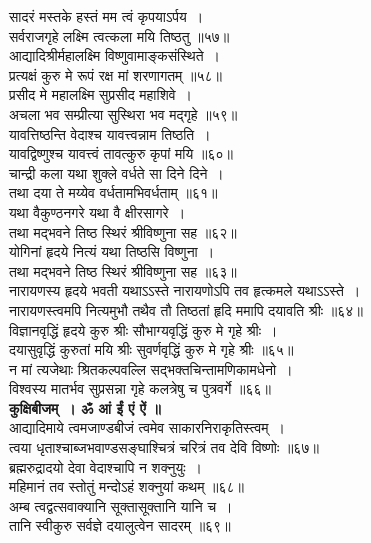 \documentclass[twoside,top=1.7cm, bottom=1.7cm, outer=1cm,landscape, inner=1.5cm,a5paper,]{book}
\begin{document}
\begin{center}
\newpage
सादरं मस्तके हस्तं मम त्वं कृपयाऽर्पय~।\\
सर्वराजगृहे लक्ष्मि त्वत्कला मयि तिष्ठतु ॥५७॥\\[10pt]
आद्यादिश्रीर्महालक्ष्मि विष्णुवामाङ्कसंस्थिते~।\\
प्रत्यक्षं कुरु मे रूपं रक्ष मां शरणागतम् ॥५८॥\\[10pt]
प्रसीद मे महालक्ष्मि सुप्रसीद महाशिवे~।\\
अचला भव सम्प्रीत्या सुस्थिरा भव मद्गृहे ॥५९॥\\[10pt]
यावत्तिष्ठन्ति वेदाश्च यावत्त्वन्नाम तिष्ठति~।\\
यावद्विष्णुश्च यावत्त्वं तावत्कुरु कृपां मयि ॥६०॥\\[10pt]
\newpage
चान्द्री कला यथा शुक्ले वर्धते सा दिने दिने~।\\
तथा दया ते मय्येव वर्धतामभिवर्धताम् ॥६१॥\\[10pt]
यथा वैकुण्ठनगरे यथा वै क्षीरसागरे~।\\
तथा मद्भवने तिष्ठ स्थिरं श्रीविष्णुना सह ॥६२॥\\[10pt]
योगिनां हृदये नित्यं यथा तिष्ठसि विष्णुना~।\\
तथा मद्भवने तिष्ठ स्थिरं श्रीविष्णुना सह ॥६३॥\\[10pt]
नारायणस्य हृदये भवती यथाऽऽस्ते नारायणोऽपि तव हृत्कमले यथाऽऽस्ते~।\\
नारायणस्त्वमपि नित्यमुभौ तथैव तौ तिष्ठतां हृदि ममापि दयावति श्रीः ॥६४॥\\[10pt]
\newpage
विज्ञानवृद्धिं हृदये कुरु श्रीः सौभाग्यवृद्धिं कुरु मे गृहे श्रीः~।\\
दयासुवृद्धिं कुरुतां मयि श्रीः सुवर्णवृद्धिं कुरु मे गृहे श्रीः ॥६५॥\\[10pt]
न मां त्यजेथाः श्रितकल्पवल्लि सद्भक्तचिन्तामणिकामधेनो~।\\
विश्वस्य मातर्भव सुप्रसन्ना गृहे कलत्रेषु च पुत्रवर्गे ॥६६॥\\[10pt]
{\bfseries कुक्षिबीजम्~। ॐ आं ईं एं ऐं ॥}\\[10pt]
आद्यादिमाये त्वमजाण्डबीजं त्वमेव साकारनिराकृतिस्त्वम्~।\\
त्वया धृताश्चाब्जभवाण्डसङ्घाश्चित्रं चरित्रं तव देवि विष्णोः ॥६७॥\\[10pt]
ब्रह्मरुद्रादयो देवा वेदाश्चापि न शक्नुयुः~।\\
महिमानं तव स्तोतुं मन्दोऽहं शक्नुयां कथम् ॥६८॥\\[10pt]
अम्ब त्वद्वत्सवाक्यानि सूक्तासूक्तानि यानि च~।\\
तानि स्वीकुरु सर्वज्ञे दयालुत्वेन सादरम् ॥६९॥\\[10pt]

\end{center}
\end{document}
